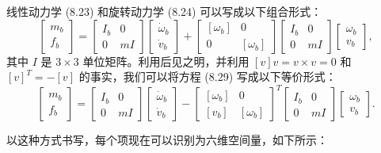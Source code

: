 \documentclass[12pt,a4paper]{article}
\begin{document}
线性动力学 (8.23) 和旋转动力学 (8.24) 可以写成以下组合形式：
\begin{equation}
\begin{bmatrix} m_b \\ f_b \end{bmatrix} = \begin{bmatrix} I_b & 0 \\ 0 & mI \end{bmatrix}\begin{bmatrix} \dot{\omega}_b \\ \dot{v}_b \end{bmatrix} + \begin{bmatrix} [\omega_b] & 0 \\ 0 & [\omega_b] \end{bmatrix}\begin{bmatrix} I_b & 0 \\ 0 & mI \end{bmatrix}\begin{bmatrix} \omega_b \\ v_b \end{bmatrix}, \label{eq:8.29}
\end{equation}
其中 $I$ 是 $3 \times 3$ 单位矩阵。利用后见之明，并利用 $[v]v = v \times v = 0$ 和 $[v]^T = -[v]$ 的事实，我们可以将方程 (8.29) 写成以下等价形式：
\begin{equation}
\begin{bmatrix} m_b \\ f_b \end{bmatrix} = \begin{bmatrix} I_b & 0 \\ 0 & mI \end{bmatrix}\begin{bmatrix} \dot{\omega}_b \\ \dot{v}_b \end{bmatrix} - \begin{bmatrix} [\omega_b] & 0 \\ [v_b] & [\omega_b] \end{bmatrix}^T\begin{bmatrix} I_b & 0 \\ 0 & mI \end{bmatrix}\begin{bmatrix} \omega_b \\ v_b \end{bmatrix}. \label{eq:8.30}
\end{equation}

以这种方式书写，每个项现在可以识别为六维空间量，如下所示：
\end{document}
